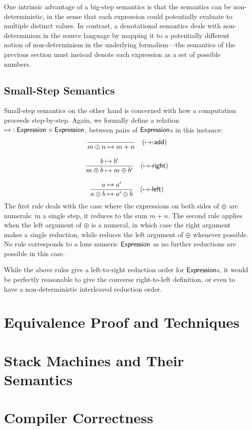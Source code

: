 One intrinsic advantage of a big-step semantics is that the semantics can be
non-deterministic, in the sense that each expression could potentially
evaluate to multiple distinct values. In contrast, a denotational semantics
deals with non-determinism in the source language by mapping it to
a potentially different notion of non-determinism in the underlying
formalism---the semantics of the previous section must instead denote each
expression as a set of possible numbers.


\subsection{Small-Step Semantics}\label{sec:small-step}%

Small-step semantics on the other hand is concerned with how a computation
proceeds step-by-step. Again, we formally define a relation ${\mapsto}
: \mathsf{Expression} \times \mathsf{Expression}$, between pairs of $\mathsf{Expression}$s in this
instance:
\begin{gather*}
\frac{}%
	{m \oplus n \mapsto m + n} \ruleTag{$\mapsto$-add} \\[2ex]
\frac{b \mapsto b'}%
	{m \oplus b \mapsto m \oplus b'} \ruleTag{$\mapsto$-right} \\[2ex]
\frac{a \mapsto a'}%
	{a \oplus b \mapsto a' \oplus b} \ruleTag{$\mapsto$-left}
\end{gather*}
The first rule  deals with the case where the
expressions on both sides of $\oplus$ are numerals: in a single step, it
reduces to the sum $m + n$. The second  rule
applies when the left argument of $\oplus$ is a numeral, in which case the
right argument makes a single reduction, while 
reduces the left argument of $\oplus$ whenever possible. No rule corresponds
to a lone numeric $\mathsf{Expression}$ as no further reductions are possible in
this case.

While the above rules give a left-to-right reduction order for
$\mathsf{Expression}$s, it would be perfectly reasonable to give the converse
right-to-left definition, or even to have a non-deterministic interleaved
reduction order.




\section{Equivalence Proof and Techniques}%




\section{Stack Machines and Their Semantics}%


\section{Compiler Correctness}%



